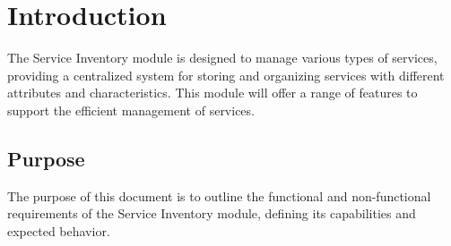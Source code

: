 \documentclass[12pt,a4paper]{article}
\begin{document}
	
 
 \clearpage
\tableofcontents
\clearpage
\section{Introduction}
The Service Inventory module is designed to manage various types of services, providing a centralized system for storing and organizing services with different attributes and characteristics. This module will offer a range of features to support the efficient management of services.
\subsection{Purpose}
The purpose of this document is to outline the functional and non-functional requirements of the Service Inventory module, defining its capabilities and expected behavior.
\end{document}
